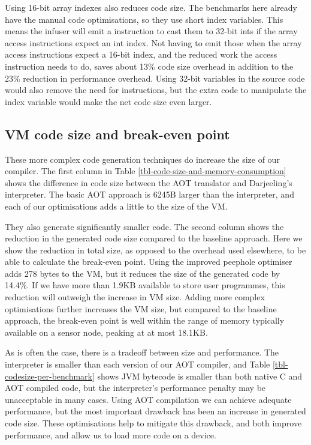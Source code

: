 Using 16-bit array indexes also reduces code size. The benchmarks here already have the manual code optimisations, so they use short index variables. This means the infuser will emit a  instruction to cast them to 32-bit ints if the array access instructions expect an int index. Not having to emit those when the array access instructions expect a 16-bit index, and the reduced work the access instruction needs to do, saves about 13\% code size overhead in addition to the 23\% reduction in performance overhead. Using 32-bit variables in the source code would also remove the need for  instructions, but the extra code to manipulate the index variable would make the net code size even larger.

\subsection{VM code size and break-even point}
These more complex code generation techniques do increase the size of our compiler. The first column in Table \ref{tbl-code-size-and-memory-consumption} shows the difference in code size between the AOT translator and Darjeeling's interpreter. The basic AOT approach is 6245B larger than the interpreter, and each of our optimisations adds a little to the size of the VM.

They also generate significantly smaller code. The second column shows the reduction in the generated code size compared to the baseline approach. Here we show the reduction in total size, as opposed to the overhead used elsewhere, to be able to calculate the break-even point. Using the improved peephole optimiser adds 278 bytes to the VM, but it reduces the size of the generated code by 14.4\%. If we have more than 1.9KB available to store user programmes, this reduction will outweigh the increase in VM size. Adding more complex optimisations further increases the VM size, but compared to the baseline approach, the break-even point is well within the range of memory typically available on a sensor node, peaking at at most 18.1KB.

As is often the case, there is a tradeoff between size and performance. The interpreter is smaller than each version of our AOT compiler, and Table \ref{tbl-codesize-per-benchmark} shows JVM bytecode is smaller than both native C and AOT compiled code, but the interpreter's performance penalty may be unacceptable in many cases. Using AOT compilation we can achieve adequate performance, but the most important drawback has been an increase in generated code size. These optimisations help to mitigate this drawback, and both improve performance, and allow us to load more code on a device.

